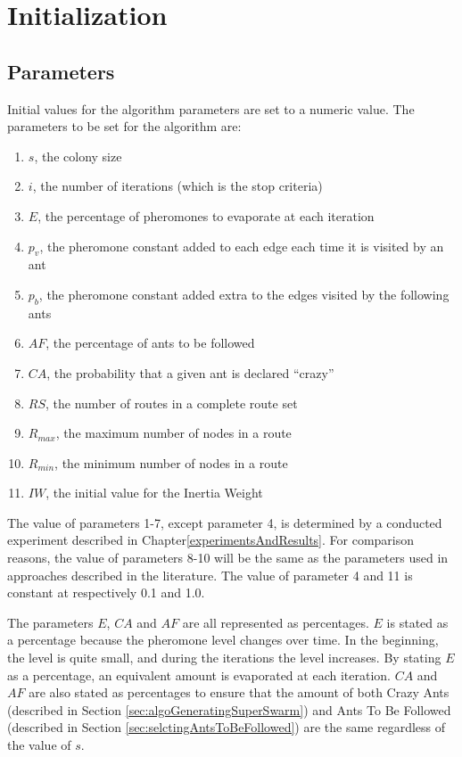 \section{Initialization}
\label{sec:algoInitialization}
\subsection{Parameters}
Initial values for the algorithm parameters are set to a numeric value. The parameters to be set for the algorithm are:
\begin{enumerate}
\item $s$, the colony size
\item $i$, the number of iterations (which is the stop criteria)
\item $E$, the percentage of pheromones to evaporate at each iteration
\item $p_v$, the pheromone constant added to each edge each time it is visited by an ant
\item $p_b$, the pheromone constant added extra to the edges visited by the following ants 
\item $AF$, the percentage of ants to be followed
\item $CA$, the probability that a given ant is declared ``crazy''
\item $RS$, the number of routes in a complete route set 
\item $R_{max}$, the maximum number of nodes in a route
\item $R_{min}$, the minimum number of nodes in a route
\item $IW$, the initial value for the Inertia Weight
\end{enumerate}

The value of parameters 1-7, except parameter 4, is determined by a conducted experiment described in Chapter\vref{experimentsAndResults}. For comparison reasons, the value of parameters 8-10 will be the same as the parameters used in approaches described in the literature\citep{mandl79, kechagiopoulos14, nikolic14,kidwai98,fan10,chakroborty02,zhang10,chew12,baaj91, mumford13}. The value of parameter 4 and 11 is constant at respectively 0.1 and 1.0.

The parameters $E$, $CA$ and $AF$ are all represented as percentages. $E$ is stated as a percentage because the pheromone level changes over time. In the beginning, the level is quite small, and during the iterations the level increases. By stating $E$ as a percentage, an equivalent amount is evaporated at each iteration. $CA$ and $AF$ are also stated as percentages to ensure that the amount of both Crazy Ants (described in Section \vref{sec:algoGeneratingSuperSwarm}) and Ants To Be Followed (described in Section \vref{sec:selctingAntsToBeFollowed}) are the same regardless of the value of $s$. 


